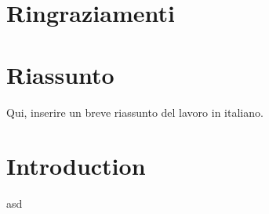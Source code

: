\documentclass[a4paper, 12pt]{book}
\begin{document}
\pagestyle{empty}
\clearpage
\tableofcontents
\thispagestyle{empty}

\chapter{Ringraziamenti}


\chapter{Riassunto}

Qui, inserire un breve riassunto del lavoro in italiano.


\chapter{Introduction}
\pagestyle{fancy}
\fancyhf{}
\renewcommand{\headrulewidth}{2pt}
\fancyhead[EL]{\textbf{\textsf{\nouppercase\thepage}}}
\fancyhead[ER]{\textbf{\textsf{\nouppercase\leftmark}}}
\fancyhead[OR]{\textbf{\textsf{\nouppercase\thepage}}}
\fancyhead[OL]{\textbf{\textsf{\nouppercase {\rightmark}}}}

\thispagestyle{empty}

asd
\newpage
\end{document}
